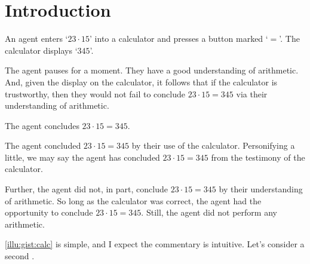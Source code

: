 \chapter{Introduction}
\label{cha:introduction}

\begin{note}
  \begin{scenario}[Multiplication]
    \label{illu:gist:calc}
    An agent enters `\(23 \cdot 15\)' into a calculator and presses a button marked `\(=\)'.
    The calculator displays `\(345\)'.

    The agent pauses for a moment.
    They have a good understanding of arithmetic.
    And, given the display on the calculator, it follows that if the calculator is trustworthy, then they would not fail to conclude \(23 \cdot 15 = 345\) via their understanding of arithmetic.

    The agent concludes \(23 \cdot 15 = 345\).
  \end{scenario}

  The agent concluded \(23 \cdot 15 = 345\) by their use of the calculator.
  Personifying a little, we may say the agent has concluded \(23 \cdot 15 = 345\) from the testimony of the calculator.

  Further, the agent did not, in part, conclude \(23 \cdot 15 = 345\) by their understanding of arithmetic.
  So long as the calculator was correct, the agent had the opportunity to conclude \(23 \cdot 15 = 345\).
  Still, the agent did not perform any arithmetic.
\end{note}

\begin{note}
  \autoref{illu:gist:calc} is simple, and I expect the commentary is intuitive.
  Let's consider a second .
\end{note}

